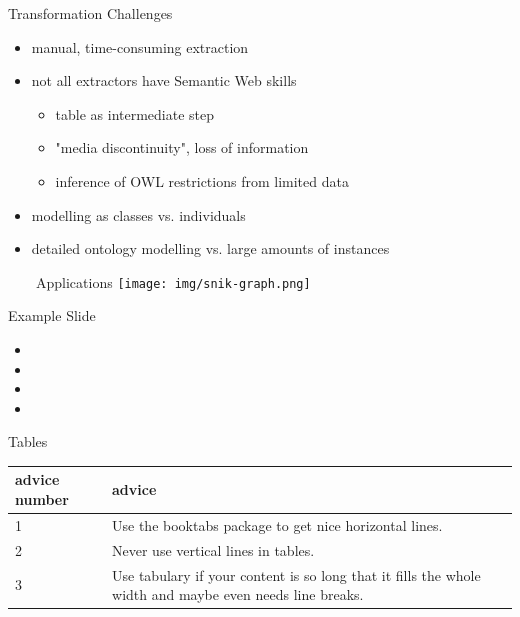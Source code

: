 \documentclass[aspectratio=1610,12pt]{beamer}
\newcommand{\imageslide}[4][]
{
\newgeometry{margin=0cm,top=1em}
\begin{frame}[plain]{~~~~#2}
\centering\texttt{[image: \#3]}
\\#1
\note{#4}
\end{frame}
\restoregeometry
}
\begin{document}
\begin{frame}{Transformation Challenges}
\begin{itemize}
\item manual, time-consuming extraction
\item not all extractors have Semantic Web skills 
\begin{itemize}
\item table as intermediate step
\item "media discontinuity", loss of information
\item inference of OWL restrictions from limited data 
\end{itemize}
\item modelling as classes vs. individuals
\item detailed ontology modelling vs. large amounts of instances 
\end{itemize}
\end{frame}




\begin{frame}[plain]{~~~~Applications}
\centering\texttt{[image: img/snik-graph.png]}
\end{frame}
\restoregeometry


\begin{frame}{Example Slide}
\begin{itemize}
\item 
\item 
\item 
\item 
\end{itemize}
\end{frame}

\begin{frame}{Tables}
\begin{tabulary}{\textwidth}{lL}
\toprule
advice number    &advice\\
   &Use the booktabs package to get nice horizontal lines.\\
2   &Never use vertical lines in tables.\\
3   &Use tabulary if your content is so long that it fills the whole width and maybe even needs line breaks.\\
\bottomrule
\end{tabulary}
\end{frame}
\end{document}
